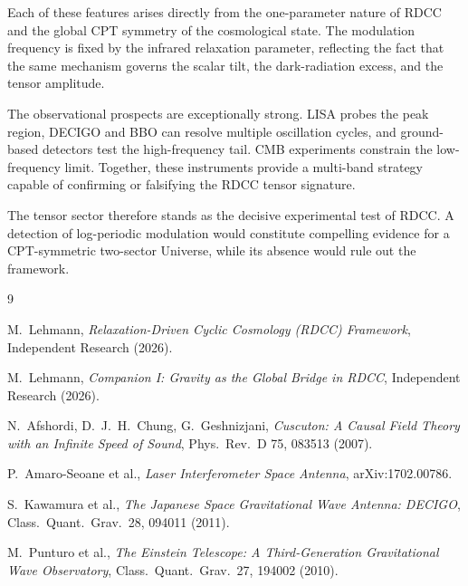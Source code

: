 \documentclass[11pt,a4paper]{article}
\begin{document}
Each of these features arises directly from the one-parameter nature of RDCC and the
global CPT symmetry of the cosmological state. The modulation frequency is fixed by the
infrared relaxation parameter, reflecting the fact that the same mechanism governs the
scalar tilt, the dark-radiation excess, and the tensor amplitude.

The observational prospects are exceptionally strong. LISA probes the peak region,
DECIGO and BBO can resolve multiple oscillation cycles, and ground-based detectors test
the high-frequency tail. CMB experiments constrain the low-frequency limit. Together,
these instruments provide a multi-band strategy capable of confirming or falsifying the
RDCC tensor signature.

The tensor sector therefore stands as the decisive experimental test of RDCC. A detection
of log-periodic modulation would constitute compelling evidence for a CPT-symmetric
two-sector Universe, while its absence would rule out the framework.

\begin{thebibliography}{9}

M.~Lehmann,
\textit{Relaxation-Driven Cyclic Cosmology (RDCC) Framework},
Independent Research (2026).

M.~Lehmann,
\textit{Companion I: Gravity as the Global Bridge in RDCC},
Independent Research (2026).

N.~Afshordi, D.~J.~H.~Chung, G.~Geshnizjani,
\textit{Cuscuton: A Causal Field Theory with an Infinite Speed of Sound},
Phys.\ Rev.\ D 75, 083513 (2007).

P.~Amaro-Seoane et al.,
\textit{Laser Interferometer Space Antenna},
arXiv:1702.00786.

S.~Kawamura et al.,
\textit{The Japanese Space Gravitational Wave Antenna: DECIGO},
Class.\ Quant.\ Grav.\ 28, 094011 (2011).

M.~Punturo et al.,
\textit{The Einstein Telescope: A Third-Generation Gravitational Wave Observatory},
Class.\ Quant.\ Grav.\ 27, 194002 (2010).

\end{thebibliography}
\end{document}
